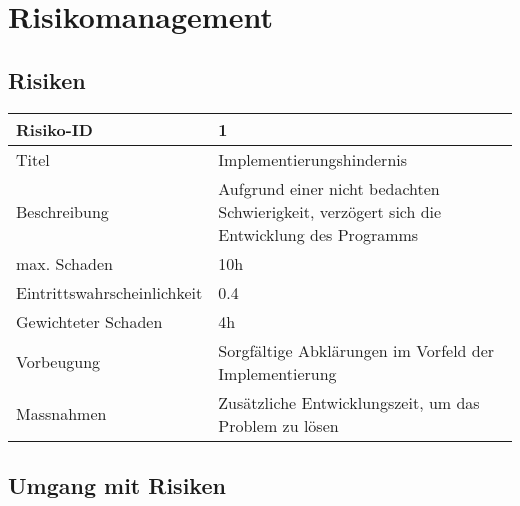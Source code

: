 \chapter{Risikomanagement}
\section{Risiken}

\begin{table}[h!]
	\centering
	\begin{tabular}{|p{} | p{} |}
	\hline	
	Risiko-ID & 1 \\
	\hline
	Titel & Implementierungshindernis \\
	Beschreibung & Aufgrund einer nicht bedachten Schwierigkeit, verzögert sich die Entwicklung des Programms \\
	max. Schaden	& 10h \\
	Eintrittswahrscheinlichkeit & 0.4 \\
	Gewichteter Schaden	& 4h \\
	Vorbeugung	& Sorgfältige Abklärungen im Vorfeld der Implementierung \\
	Massnahmen	& Zusätzliche Entwicklungszeit, um das Problem zu lösen \\
	\hline
	\end{tabular}
\end{table}


\clearpage	

\section{Umgang mit Risiken}
